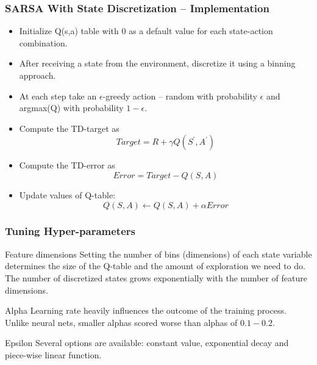 \documentclass{beamer}
\begin{document}
\begin{frame}
\frametitle{SARSA With State Discretization -- Implementation}
\begin{itemize}
	\item Initialize Q(s,a) table with 0 as a default 
	value for each state-action combination.
	
	\item After receiving a state from the environment, discretize it 
	using a binning approach.
	
	\item At each step take an $\epsilon$-greedy action -- random 
	with probability $\epsilon$ and 
	argmax(Q) with probability $1-\epsilon$.
	
	\item Compute the TD-target as
	\begin{equation}
	Target = R+\gamma Q\left(S^{\prime}, A^{\prime}\right)
	\end{equation}
	
	\item Compute the TD-error as
	\begin{equation}
	Error = Target - Q\left(S, A\right)
	\end{equation}	
	\item Update values of Q-table:
	\begin{equation}
	Q(S, A) \leftarrow Q(S, A)+\alpha Error
	\end{equation}		
\end{itemize} 
\end{frame}




\begin{frame}
\frametitle{Tuning Hyper-parameters}

\begin{block}{Feature dimensions}
	Setting the number of bins (dimensions) of 
	each state variable determines the size of the Q-table and the amount 
	of exploration we need to do. The number of discretized states grows 
	exponentially with the number of feature dimensions. 
\end{block}

\begin{block}{Alpha}
	Learning rate heavily influences the outcome of the 
	training process. Unlike neural nets, smaller alphas scored worse than 
	alphas of $0.1-0.2$.
\end{block}

\begin{block}{Epsilon}
	Several options are available: constant value, 
	exponential decay and piece-wise linear function.
\end{block}

\end{frame}
\end{document}
